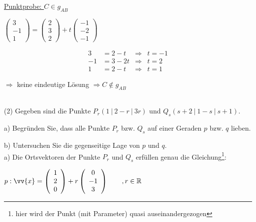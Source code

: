 \pagebreak

\underline{Punktprobe: $C \in g_{AB}$}

\begin{minipage}{0.5\textwidth}
    $\left(\begin{array}{c}  3 \\ -1 \\ 1 \end{array}\right) = \left(\begin{array}{c}  2 \\ 3 \\ 2 \end{array}\right) + t \left(\begin{array}{c} -1 \\ -2 \\ -1 \end{array}\right)$
\end{minipage}
\begin{minipage}{0.5\textwidth}
    \begin{align*}
        3 & = 2 - t &\Rightarrow & t = -1 \\
        -1 & = 3 - 2t &\Rightarrow & t = 2 \\
        1 & = 2 - t &\Rightarrow & t = 1
    \end{align*}

    $\Rightarrow$ keine eindeutige Lösung $\Rightarrow C \not\in g_{AB}$
\end{minipage}\\

(2) Gegeben sind die Punkte $P_r (1 \ | \ 2 - r \ | \ 3r)$ und $Q_s(s+2 \ | \ 1-s \ | \ s+1)$. 

a) Begründen Sie, dass alle Punkte $P_r$ bzw. $Q_s$  auf einer Geraden $p$ bzw. $q$ lieben.

b) Untersuchen Sie die gegenseitige Lage von $p$ und $q$. \\

a) Die Ortsvektoren der Punkte $P_r$ und $Q_s$ erfüllen genau die Gleichung\footnote{hier wird der Punkt (mit Parameter) quasi \glqq auseinandergezogen\grqq{}}:

$p: \vv{x} = \left(\begin{array}{c}  1 \\ 2 \\ 0 \end{array}\right) + r \left(\begin{array}{c}  0 \\ -1 \\ 3 \end{array}\right) \qquad ,r \in \mathbb{R}$

